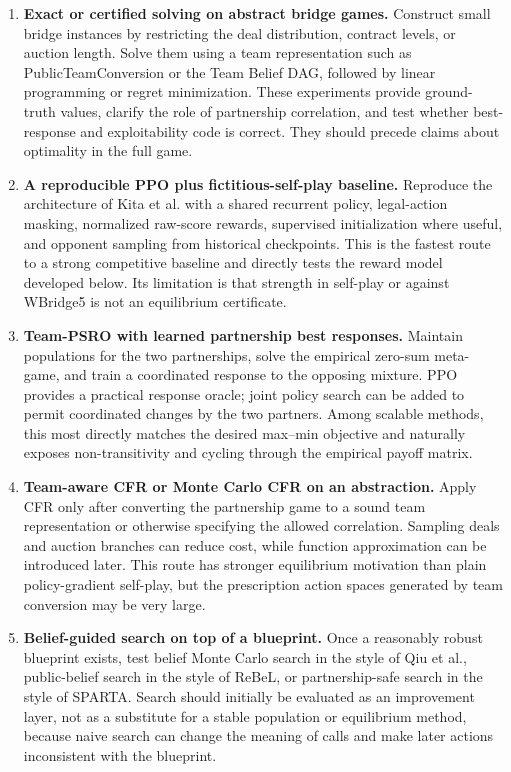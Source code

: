 \documentclass[11pt]{article}
\begin{document}
\begin{enumerate}
    \item \textbf{Exact or certified solving on abstract bridge games.} Construct small bridge instances by restricting the deal distribution, contract levels, or auction length. Solve them using a team representation such as PublicTeamConversion or the Team Belief DAG, followed by linear programming or regret minimization. These experiments provide ground-truth values, clarify the role of partnership correlation, and test whether best-response and exploitability code is correct. They should precede claims about optimality in the full game.

    \item \textbf{A reproducible PPO plus fictitious-self-play baseline.} Reproduce the architecture of Kita et al. with a shared recurrent policy, legal-action masking, normalized raw-score rewards, supervised initialization where useful, and opponent sampling from historical checkpoints. This is the fastest route to a strong competitive baseline and directly tests the reward model developed below. Its limitation is that strength in self-play or against WBridge5 is not an equilibrium certificate.

    \item \textbf{Team-PSRO with learned partnership best responses.} Maintain populations for the two partnerships, solve the empirical zero-sum meta-game, and train a coordinated response to the opposing mixture. PPO provides a practical response oracle; joint policy search can be added to permit coordinated changes by the two partners. Among scalable methods, this most directly matches the desired max--min objective and naturally exposes non-transitivity and cycling through the empirical payoff matrix.

    \item \textbf{Team-aware CFR or Monte Carlo CFR on an abstraction.} Apply CFR only after converting the partnership game to a sound team representation or otherwise specifying the allowed correlation. Sampling deals and auction branches can reduce cost, while function approximation can be introduced later. This route has stronger equilibrium motivation than plain policy-gradient self-play, but the prescription action spaces generated by team conversion may be very large.

    \item \textbf{Belief-guided search on top of a blueprint.} Once a reasonably robust blueprint exists, test belief Monte Carlo search in the style of Qiu et al., public-belief search in the style of ReBeL, or partnership-safe search in the style of SPARTA. Search should initially be evaluated as an improvement layer, not as a substitute for a stable population or equilibrium method, because naive search can change the meaning of calls and make later actions inconsistent with the blueprint.


\end{enumerate}
\end{document}
